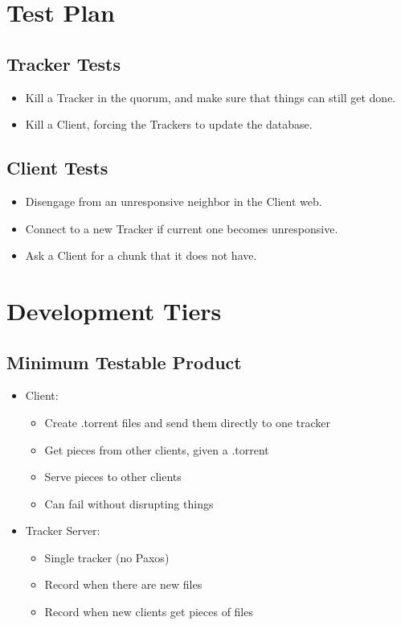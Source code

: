 \documentclass[11pt]{article}
\begin{document}
\section*{Test Plan}

\subsection*{Tracker Tests}
\begin{itemize}
\item  Kill a Tracker in the quorum,
       and make sure that things can still get done.
\item  Kill a Client, forcing the Trackers to update the database.
\end{itemize}

\subsection*{Client Tests}
\begin{itemize}
\item  Disengage from an unresponsive neighbor in the Client web.
\item  Connect to a new Tracker if current one becomes unresponsive.
\item  Ask a Client for a chunk that it does not have.
\end{itemize}

\section*{Development Tiers}

\subsection*{Minimum Testable Product}
\begin{itemize}
\item  Client:
    \begin{itemize}
    \item  Create .torrent files and send them directly to one tracker
    \item  Get pieces from other clients, given a .torrent
    \item  Serve pieces to other clients
    \item  Can fail without disrupting things
    \end{itemize}
\item  Tracker Server:
    \begin{itemize}
    \item  Single tracker (no Paxos)
    \item  Record when there are new files
    \item  Record when new clients get pieces of files
    \end{itemize}
\end{itemize}
\end{document}
